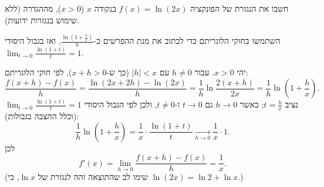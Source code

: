 
\begin{question}
חשבו את הנגזרת של הפונקציה $f(x)=\ln(2x)$ בנקודה $x$ ($x>0$), מההגדרה (ללא שימוש בנגזרות ידועות).
\end{question}

\begin{hint}
השתמשו בחוקי הלוגריתם כדי לכתוב את מנת ההפרשים כ-$\frac{\ln(1+\frac hx)}{h}$, ואז בגבול היסודי $\lim_{t\to0}\frac{\ln(1+t)}{t}=1$.
\end{hint}

\begin{solution}
יהי $x>0$. עבור $h\ne0$ עם $|h|<x$ (כך ש-$x+h>0$), לפי חוקי הלוגריתם:
\[ \frac{f(x+h)-f(x)}{h}=\frac{\ln(2x+2h)-\ln(2x)}{h}=\frac{1}{h}\ln\frac{2(x+h)}{2x}=\frac1h\ln\left(1+\frac hx\right). \]
נציב $t=\frac hx$; כאשר $h\to0$ גם $t\to0$ ו-$t\ne0$, ולכן לפי הגבול היסודי $\lim_{t\to0}\frac{\ln(1+t)}{t}=1$ (וכלל ההצבה בגבולות):
\[ \frac1h\ln\left(1+\frac hx\right)=\frac1x\cdot\frac{\ln(1+t)}{t}\xrightarrow[h\to0]{}\frac1x\cdot1. \]
לכן
\[ \boxed{f'(x)=\lim_{h\to0}\frac{f(x+h)-f(x)}{h}=\frac1x}. \]
(שימו לב שהתוצאה זהה לנגזרת של $\ln x$, כי $\ln(2x)=\ln2+\ln x$.)
\end{solution}
